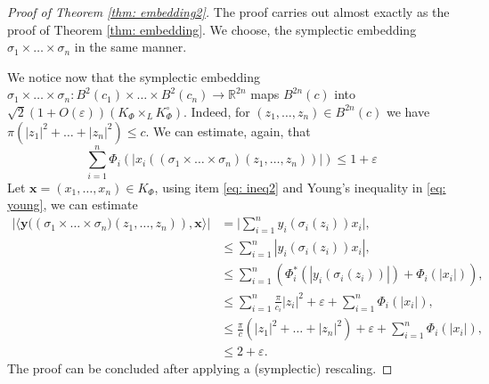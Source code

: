 \documentclass{article}
\theoremstyle{definition}
\begin{document}
\begin{proof}[Proof of Theorem \ref{thm: embedding2}]
The proof carries out almost exactly as the proof of Theorem \ref{thm: embedding}. We choose, the symplectic embedding $\sigma_1\times\ldots \times \sigma_n$ in the same manner.

We notice now that the symplectic embedding $\sigma_1\times\ldots\times\sigma_n: B^2(c_1) \times\ldots\times B^2(c_n) \to \mathbb{R}^{2n}$ maps $B^{2n}(c)$ into $\sqrt{2}(1+O(\varepsilon))(K_{\Phi}\times_L K_{\Phi}^{\circ})$. Indeed, for $(z_1,\ldots,z_n)\in B^{2n}(c)$ we have $\pi(|z_1|^2+\ldots+|z_n|^2) \leq c$. We can estimate, again, that
\begin{equation*}
\sum_{i=1}^n\Phi_i(|x_i\left((\sigma_1\times\ldots\times \sigma_n)(z_1,\ldots,z_n)\right)|)\leq 1+\varepsilon
\end{equation*}
Let $\mathbf{x}=(x_1,\ldots,x_n)\in K_{\Phi}$, using item \eqref{eq: ineq2} and Young's inequality in \eqref{eq: young}, we can estimate
\begin{equation*}
\begin{split}
 |\langle\mathbf{y}(\left(\sigma_1\times\ldots\times \sigma_n)(z_1,\ldots,z_n)\right),\mathbf{x}\rangle|&=\bigg|\sum_{i=1}^n y_i(\sigma_i(z_i))x_i\bigg|,\\
&\leq\sum_{i=1}^n |y_i(\sigma_i(z_i))x_i|,\\
&\leq \sum_{i=1}^n \left(\Phi_i^*(|y_i(\sigma_i(z_i))|)+\Phi_i(|x_i|)\right),\\
&\leq \sum_{i=1}^n\frac{\pi}{c_i}|z_i|^2+\varepsilon+\sum_{i=1}^n \Phi_i(|x_i|),\\
& \leq\frac{\pi}{c}(|z_1|^2+\ldots+|z_n|^2)+\varepsilon+\sum_{i=1}^n \Phi_i(|x_i|),\\
&\leq 2+\varepsilon.
\end{split}
\end{equation*}
The proof can be concluded after applying a (symplectic) rescaling.
\end{proof}

\end{document}
